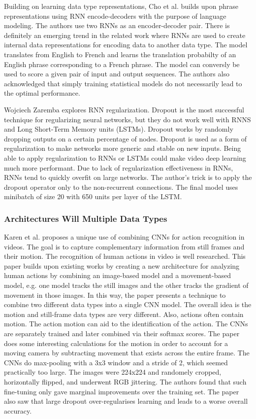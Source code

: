 Building on learning data type representations, Cho et al. builds upon phrase representations using RNN encode-decoders with the purpose of language modeling.  The authors use two RNNs as an encoder-decoder pair.  There is definitely an emerging trend in the related work where RNNs are used to create internal data representations for encoding data to another data type.  The model translates from English to French and learns the translation probabilty of an English phrase corresponding to a French phrase.  The model can conversly be used to score a given pair of input and output sequences. The authors also acknowledged that simply training statistical models do not necessarily lead to the optimal performance.

Wojciech Zaremba explores RNN regularization.  Dropout is the most successful technique for regularizing neural networks, but they do not work well with RNNS and Long Short-Term Memory units (LSTMs).  Dropout works by randomly dropping outputs on a certain percentage of nodes.  Dropout is used as a form of regularization to make networks more generic and stable on new inputs.  Being able to apply regularization to RNNs or LSTMs could make video deep learning much more performant.  Due to lack of regularization effectiveness in RNNs, RNNs tend to quickly overfit on large networks.  The author's trick is to apply the dropout operator only to the non-recurrent connections.  The final model uses minibatch of size 20 with 650 units per layer of the LSTM.

\subsubsection{Architectures Will Multiple Data Types}
Karen et al. proposes a unique use of combining CNNs for action recognition in videos.  The goal is to capture complementary information from still frames and their motion. The recognition of human actions in video is well researched.  This paper builds upon existing works by creating a new architecture for analyzing human actions by combining an image-based model and a movement-based model, e.g. one model tracks the still images and the other tracks the gradient of movement in those images.  In this way, the paper presents a technique to combine two different data types into a single CNN model.  The overall idea is the motion and still-frame data types are very different. Also, actions often contain motion.  The action motion can aid to the identification of the action.  The CNNs are separately trained and later combined via their softmax scores.  The paper does some interesting calculations for the motion in order to account for a moving camera by subtracting movement that exists across the entire frame.  The CNNs do max-pooling with a 3x3 window and a stride of 2, which seemed practically too large.  The images were 224x224 and randomely cropped, horizontally flipped, and underwent RGB jittering.  The authors found that such fine-tuning only gave marginal improvements over the training set.  The paper also saw that large dropout over-regularises learning and leads to a worse overall accuracy.

